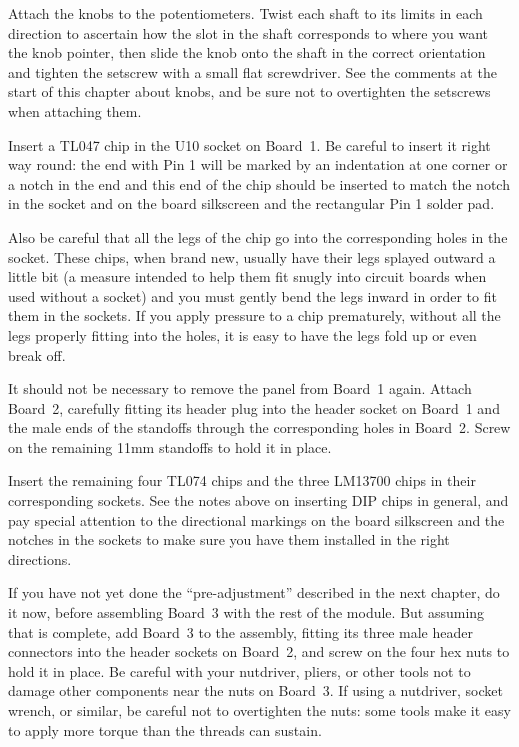 Attach the knobs to the potentiometers.  Twist each shaft to its limits in
each direction to ascertain how the slot in the shaft corresponds to where
you want the knob pointer, then slide the knob onto the shaft in the correct
orientation and tighten the setscrew with a small flat screwdriver.  See the
comments at the start of this chapter about knobs, and be sure not to
overtighten the setscrews when attaching them.

Insert a TL047 chip in the U10 socket on Board~1.  Be careful to insert it
right way round: the end with Pin 1 will be marked by an indentation at one
corner or a notch in the end and this end of the chip should be inserted to
match the notch in the socket and on the board silkscreen and the
rectangular Pin 1 solder pad.

Also be careful that all the legs of the chip go into the corresponding
holes in the socket.  These chips, when brand new, usually have their legs
splayed outward a little bit (a measure intended to help them fit snugly
into circuit boards when used without a socket) and you must gently bend the
legs inward in order to fit them in the sockets.  If you apply pressure to a
chip prematurely, without all the legs properly fitting into the holes, it
is easy to have the legs fold up or even break off.

It should not be necessary to remove the panel from Board~1 again.  Attach
Board~2, carefully fitting its header plug into the header socket on Board~1
and the male ends of the standoffs through the corresponding holes in Board~2. 
Screw on the remaining 11mm standoffs to hold it in place.

Insert the remaining four TL074 chips and the three LM13700 chips in their
corresponding sockets.  See the notes above on inserting DIP chips in
general, and pay special attention to the directional markings on the board
silkscreen and the notches in the sockets to make sure you have them
installed in the right directions.

If you have not yet done the ``pre-adjustment'' described in the next
chapter, do it now, before assembling Board~3 with the rest of the module. 
But assuming that is complete, add Board~3 to the assembly, fitting its
three male header connectors into the header sockets on Board~2, and screw
on the four hex nuts to hold it in place.  Be careful with your nutdriver,
pliers, or other tools not to damage other components near the nuts on
Board~3.  If using a nutdriver, socket wrench, or similar, be careful not to
overtighten the nuts:  some tools make it easy to apply more torque than the
threads can sustain.

